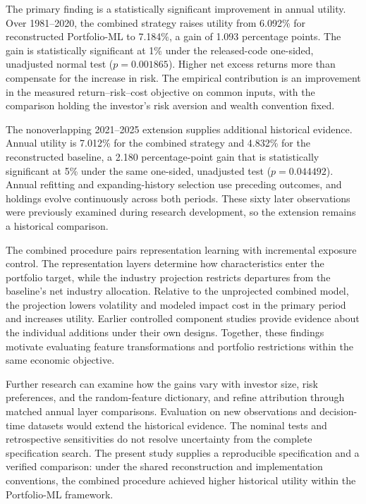 \documentclass[12pt,letterpaper,fleqn]{article}
\begin{document}
The primary finding is a statistically significant improvement in annual utility. Over 1981--2020, the combined strategy raises utility from 6.092\% for reconstructed Portfolio-ML to 7.184\%, a gain of 1.093 percentage points. The gain is statistically significant at 1\% under the released-code one-sided, unadjusted normal test ($p=0.001865$). Higher net excess returns more than compensate for the increase in risk. The empirical contribution is an improvement in the measured return--risk--cost objective on common inputs, with the comparison holding the investor's risk aversion and wealth convention fixed.

The nonoverlapping 2021--2025 extension supplies additional historical evidence. Annual utility is 7.012\% for the combined strategy and 4.832\% for the reconstructed baseline, a 2.180 percentage-point gain that is statistically significant at 5\% under the same one-sided, unadjusted test ($p=0.044492$). Annual refitting and expanding-history selection use preceding outcomes, and holdings evolve continuously across both periods. These sixty later observations were previously examined during research development, so the extension remains a historical comparison.

The combined procedure pairs representation learning with incremental exposure control. The representation layers determine how characteristics enter the portfolio target, while the industry projection restricts departures from the baseline's net industry allocation. Relative to the unprojected combined model, the projection lowers volatility and modeled impact cost in the primary period and increases utility. Earlier controlled component studies provide evidence about the individual additions under their own designs. Together, these findings motivate evaluating feature transformations and portfolio restrictions within the same economic objective.

Further research can examine how the gains vary with investor size, risk preferences, and the random-feature dictionary, and refine attribution through matched annual layer comparisons. Evaluation on new observations and decision-time datasets would extend the historical evidence. The nominal tests and retrospective sensitivities do not resolve uncertainty from the complete specification search. The present study supplies a reproducible specification and a verified comparison: under the shared reconstruction and implementation conventions, the combined procedure achieved higher historical utility within the Portfolio-ML framework.
\end{document}
